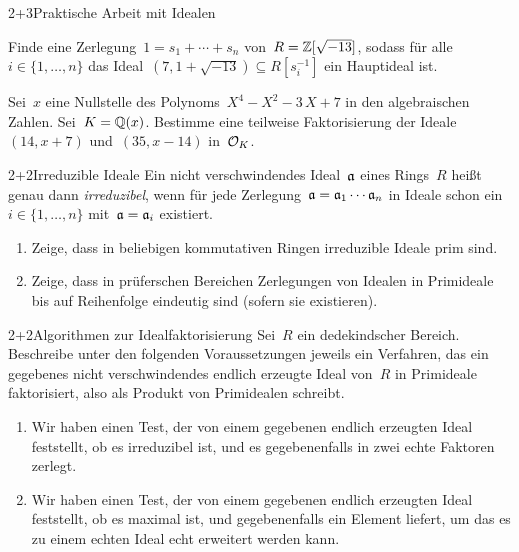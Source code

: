 \documentclass{algblatt}
\begin{document}

\begin{aufgabeE}{2+3}{Praktische Arbeit mit Idealen}
\item Finde eine Zerlegung~$1 = s_1 + \cdots + s_n$ von~$R = \ZZ[\sqrt{-13}]$,
sodass für alle~$i \in \{ 1,\ldots,n \}$ das Ideal~$(7, 1 + \sqrt{-13})
\subseteq R[s_i^{-1}]$ ein Hauptideal ist.
\item Sei~$x$ eine Nullstelle des Polynoms~$X^4-X^2-3\,X+7$ in den
algebraischen Zahlen. Sei~$K = \QQ(x)$. Bestimme eine teilweise Faktorisierung
der Ideale~$(14,x+7)$ und~$(35,x-14)$ in~$\O_K$.
\end{aufgabeE}

\begin{aufgabe}{2+2}{Irreduzible Ideale}
Ein nicht verschwindendes Ideal~$\aa$ eines Rings~$R$ heißt genau dann
\emph{irreduzibel}, wenn für jede Zerlegung~$\aa = \aa_1 \cdots \aa_n$ in
Ideale schon ein~$i \in \{1,\ldots,n\}$ mit~$\aa = \aa_i$ existiert.
\begin{enumerate}
\item Zeige, dass in beliebigen kommutativen Ringen irreduzible Ideale
prim
sind.
\item Zeige, dass in prüferschen Bereichen Zerlegungen von Idealen in Primideale
bis auf Reihenfolge eindeutig sind (sofern sie existieren).
\end{enumerate}
\end{aufgabe}

\begin{aufgabe}{2+2}{Algorithmen zur Idealfaktorisierung}
Sei~$R$ ein dedekindscher Bereich. Beschreibe unter den folgenden
Voraussetzungen jeweils ein Verfahren, das ein gegebenes nicht verschwindendes
endlich erzeugte Ideal von~$R$ in Primideale faktorisiert, also als Produkt von
Primidealen schreibt.
\begin{enumerate}
\item Wir haben einen Test, der von einem gegebenen endlich erzeugten Ideal feststellt,
ob es irreduzibel ist, und es gegebenenfalls in zwei echte Faktoren zerlegt.
\item Wir haben einen Test, der von einem gegebenen endlich erzeugten Ideal
feststellt, ob es maximal ist, und gegebenenfalls ein Element liefert, um das
es zu einem echten Ideal echt erweitert werden kann.
\end{enumerate}
\end{aufgabe}
\end{document}

